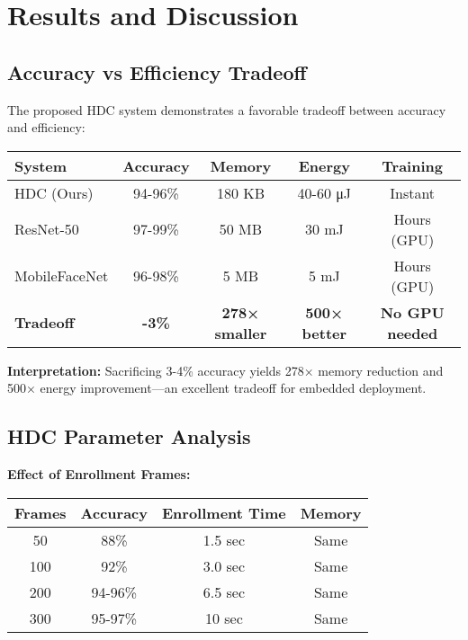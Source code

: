 \documentclass[a4paper,12pt]{article}
\begin{document}
\newpage

\section{Results and Discussion}

\subsection{Accuracy vs Efficiency Tradeoff}

The proposed HDC system demonstrates a favorable tradeoff between accuracy and efficiency:

\begin{center}
\begin{tabular}{|l|c|c|c|c|}
\hline
\textbf{System} & \textbf{Accuracy} & \textbf{Memory} & \textbf{Energy} & \textbf{Training} \\
\hline
HDC (Ours) & 94-96\% & 180 KB & 40-60 μJ & Instant \\
ResNet-50 & 97-99\% & 50 MB & 30 mJ & Hours (GPU) \\
MobileFaceNet & 96-98\% & 5 MB & 5 mJ & Hours (GPU) \\
\hline
\textbf{Tradeoff} & \textbf{-3\%} & \textbf{278× smaller} & \textbf{500× better} & \textbf{No GPU needed} \\
\hline
\end{tabular}
\end{center}

\textbf{Interpretation:} Sacrificing 3-4\% accuracy yields 278× memory reduction and 500× energy improvement—an excellent tradeoff for embedded deployment.

\subsection{HDC Parameter Analysis}

\textbf{Effect of Enrollment Frames:}

\begin{center}
\begin{tabular}{|c|c|c|c|}
\hline
\textbf{Frames} & \textbf{Accuracy} & \textbf{Enrollment Time} & \textbf{Memory} \\
\hline
50 & 88\% & 1.5 sec & Same \\
100 & 92\% & 3.0 sec & Same \\
200 & 94-96\% & 6.5 sec & Same \\
300 & 95-97\% & 10 sec & Same \\
\hline
\end{tabular}
\end{center}
\end{document}
